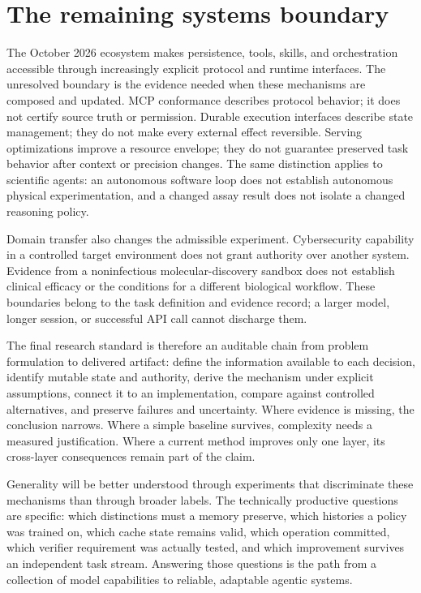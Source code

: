 \section{The remaining systems boundary}\label{sec:C34:07}
The October 2026 ecosystem makes persistence, tools, skills, and orchestration accessible through increasingly explicit protocol and runtime interfaces. The unresolved boundary is the evidence needed when these mechanisms are composed and updated. MCP conformance describes protocol behavior; it does not certify source truth or permission. Durable execution interfaces describe state management; they do not make every external effect reversible. Serving optimizations improve a resource envelope; they do not guarantee preserved task behavior after context or precision changes. The same distinction applies to scientific agents: an autonomous software loop does not establish autonomous physical experimentation, and a changed assay result does not isolate a changed reasoning policy.

Domain transfer also changes the admissible experiment. Cybersecurity capability in a controlled target environment does not grant authority over another system. Evidence from a noninfectious molecular-discovery sandbox does not establish clinical efficacy or the conditions for a different biological workflow. These boundaries belong to the task definition and evidence record; a larger model, longer session, or successful API call cannot discharge them.

The final research standard is therefore an auditable chain from problem formulation to delivered artifact: define the information available to each decision, identify mutable state and authority, derive the mechanism under explicit assumptions, connect it to an implementation, compare against controlled alternatives, and preserve failures and uncertainty. Where evidence is missing, the conclusion narrows. Where a simple baseline survives, complexity needs a measured justification. Where a current method improves only one layer, its cross-layer consequences remain part of the claim.

Generality will be better understood through experiments that discriminate these mechanisms than through broader labels. The technically productive questions are specific: which distinctions must a memory preserve, which histories a policy was trained on, which cache state remains valid, which operation committed, which verifier requirement was actually tested, and which improvement survives an independent task stream. Answering those questions is the path from a collection of model capabilities to reliable, adaptable agentic systems.


